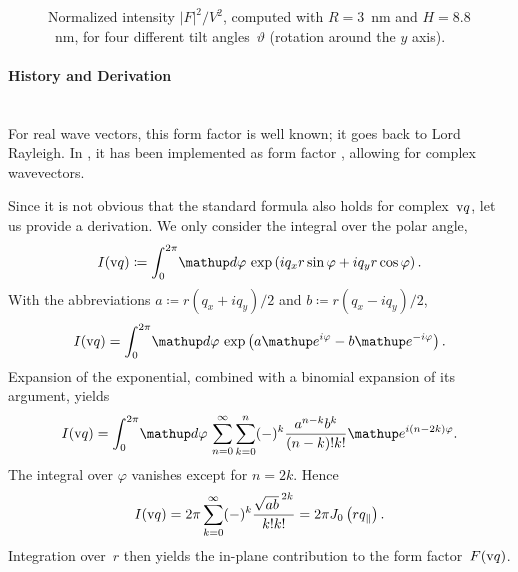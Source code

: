 \begin{figure}[H]
\begin{center}
\end{center}
\caption{Normalized intensity $|F|^2/V^2$,
computed with $R=3$~nm and $H=8.8$~nm,
for four different tilt angles~$\vartheta$ (rotation around the $y$ axis).}
\end{figure}

\paragraph{History and Derivation}\strut\\
For real wave vectors, this form factor is well known;
it goes back to Lord Rayleigh.
In \IsGISAXS, it has been implemented as form factor 
\cite[Eq.~2.27]{Laz08} \cite[Eq.~223]{ReLL09},
allowing for complex wavevectors.

Since it is not obvious that the standard formula also holds for complex~$\text{v}{q}$,
let us provide a derivation. We only consider the integral over the polar angle,
\begin{equation}
  I(\q) \coloneqq \int_0^{2\pi}\!\d\varphi\,\exp\left(iq_xr\sin\varphi+iq_yr\cos\varphi\right).
\end{equation}
With the abbreviations $a\coloneqq r(q_x+iq_y)/2$ and $b\coloneqq r(q_x-iq_y)/2$,
\begin{equation}
  I(\q) = \int_0^{2\pi}\!\d\varphi\,\exp\left(a\e^{i\varphi}-b\e^{-i\varphi}\right).
\end{equation}
Expansion of the exponential, combined with a binomial expansion of its argument, yields
\begin{equation}
  I(\q)
  = \int_0^{2\pi}\!\d\varphi\,
  \sum_{n=0}^\infty\sum_{k=0}^n(-)^k\frac{a^{n-k}b^{k}}{(n-k)!k!}\e^{i(n-2k)\varphi}.
\end{equation}
The integral over $\varphi$ vanishes except for $n=2k$. Hence
\begin{equation}
  I(\text{v}{q})
  = 2\pi \sum_{k=0}^\infty(-)^k\frac{{\sqrt{ab}\,}^{2k}}{k!k!}
  = 2\pi J_0\left(rq_\parallel\right).
\end{equation}
Integration over~$r$ then yields the in-plane contribution to the form factor~$F(\text{v}{q})$.


 \label{SDodecahedron}

